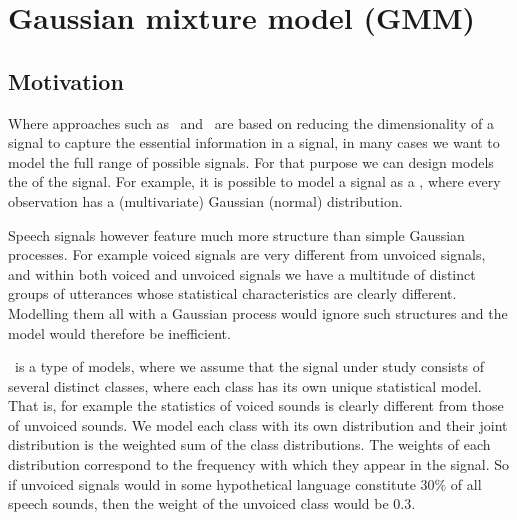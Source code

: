 \documentclass[letterpaper,10pt,english]{jupyterBook}
\begin{document}
\sphinxstepscope


\section{Gaussian mixture model (GMM)}
\label{\detokenize{Modelling/Gaussian_mixture_model_GMM:gaussian-mixture-model-gmm}}\label{\detokenize{Modelling/Gaussian_mixture_model_GMM::doc}}

\subsection{Motivation}
\label{\detokenize{Modelling/Gaussian_mixture_model_GMM:motivation}}
\sphinxAtStartPar
Where approaches such as {\hyperref[\detokenize{Modelling/Linear_regression::doc}]{}}
and {\hyperref[\detokenize{Modelling/Sub-space_models::doc}]{}} are based on reducing the
dimensionality of a signal to capture the essential information in a
signal, in many cases we want to model the full range of possible
signals. For that purpose we can design models the  of the signal. For example, it is possible to model a
signal as a , where every
observation has a (multivariate) Gaussian (normal) distribution.

\sphinxAtStartPar
Speech signals however feature much more structure than simple Gaussian
processes. For example voiced signals are very different from unvoiced
signals, and within both voiced and unvoiced signals we have a multitude
of distinct groups of utterances whose statistical characteristics are
clearly different. Modelling them all with a Gaussian process would
ignore such structures and the model would therefore be inefficient.

\sphinxAtStartPar
{} is a
type of models, where we assume that the signal under study consists of
several distinct classes, where each class has its own unique
statistical model. That is, for example the statistics of voiced sounds
is clearly different from those of unvoiced sounds. We model each class
with its own distribution and their joint distribution is the weighted
sum of the class distributions. The weights of each distribution
correspond to the frequency with which they appear in the signal. So if
unvoiced signals would in some hypothetical language constitute 30\% of
all speech sounds, then the weight of the unvoiced class would be 0.3.
\end{document}
